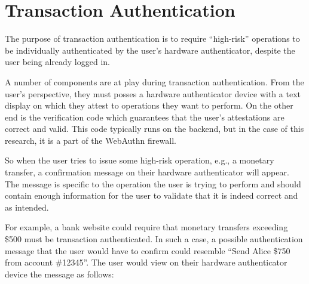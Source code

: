 
\section{Transaction Authentication}

\iffalse
Transaction authentication defends against a class of vulnerabilities not covered by traditional two-factor authentication. 
\fi

The purpose of transaction authentication is to require ``high-risk'' operations to be individually authenticated by the user's hardware authenticator, despite the user being already logged in. 

A number of components are at play during transaction authentication. From the user's perspective, they must posses a hardware authenticator device with a text display on which they attest to operations they want to perform. On the other end is the verification code which guarantees that the user's attestations are correct and valid. This code typically runs on the backend, but in the case of this research, it is a part of the WebAuthn firewall.

So when the user tries to issue some high-risk operation, e.g., a monetary transfer, a confirmation message on their hardware authenticator will appear. The message is specific to the operation the user is trying to perform and should contain enough information for the user to validate that it is indeed correct and as intended. 

For example, a bank website could require that monetary transfers exceeding \$500 must be transaction authenticated. In such a case, a possible authentication message that the user would have to confirm could resemble ``Send Alice \$750 from account \#12345''. The user would view on their hardware authenticator device the message as follows:

